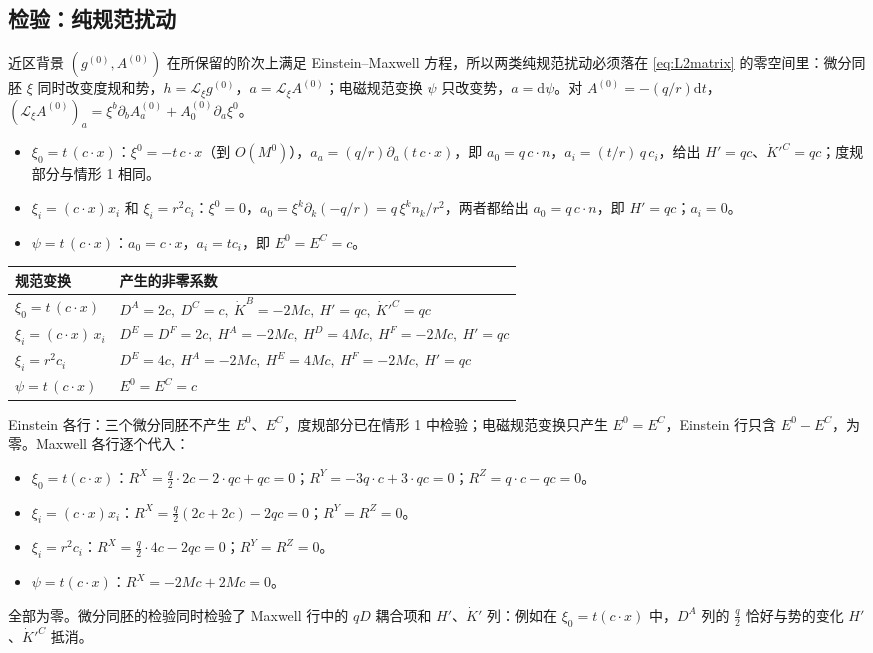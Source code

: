 \documentclass[11pt,a4paper]{ctexart}
\numberwithin{equation}{section}
\newcommand{\dd}{\mathrm d}
\begin{document}
\subsection{检验：纯规范扰动}

近区背景 $(g^{(0)},A^{(0)})$ 在所保留的阶次上满足 Einstein--Maxwell 方程，所以两类纯规范扰动必须落在 \eqref{eq:L2matrix} 的零空间里：微分同胚 $\xi$ 同时改变度规和势，$h=\mathcal L_\xi g^{(0)}$，$a=\mathcal L_\xi A^{(0)}$；电磁规范变换 $\psi$ 只改变势，$a=\dd\psi$。对 $A^{(0)}=-(q/r)\dd t$，$(\mathcal L_\xi A^{(0)})_a=\xi^b\partial_bA^{(0)}_a+A^{(0)}_0\partial_a\xi^0$。
\begin{itemize}
\item $\xi_0=t\,(c\cdot x)$：$\xi^0=-t\,c\cdot x$（到 $O(M^0)$），$a_a=(q/r)\partial_a(t\,c\cdot x)$，即 $a_0=q\,c\cdot n$，$a_i=(t/r)\,q\,c_i$，给出 $H'=qc$、$\dot K'^C=qc$；度规部分与情形 1 相同。
\item $\xi_i=(c\cdot x)x_i$ 和 $\xi_i=r^2c_i$：$\xi^0=0$，$a_0=\xi^k\partial_k(-q/r)=q\,\xi^kn_k/r^2$，两者都给出 $a_0=q\,c\cdot n$，即 $H'=qc$；$a_i=0$。
\item $\psi=t\,(c\cdot x)$：$a_0=c\cdot x$，$a_i=tc_i$，即 $E^0=E^C=c$。
\end{itemize}
\begin{center}\small
\begin{tabular}{p{}p{}}
\hline
规范变换 & 产生的非零系数\\
\hline
$\xi_0=t\,(c\cdot x)$ & $D^A=2c,\ D^C=c,\ \dot K^B=-2Mc,\ H'=qc,\ \dot K'^C=qc$\\
$\xi_i=(c\cdot x)\,x_i$ & $D^E=D^F=2c,\ H^A=-2Mc,\ H^D=4Mc,\ H^F=-2Mc,\ H'=qc$\\
$\xi_i=r^2c_i$ & $D^E=4c,\ H^A=-2Mc,\ H^E=4Mc,\ H^F=-2Mc,\ H'=qc$\\
$\psi=t\,(c\cdot x)$ & $E^0=E^C=c$\\
\hline
\end{tabular}
\end{center}
Einstein 各行：三个微分同胚不产生 $E^0$、$E^C$，度规部分已在情形 1 中检验；电磁规范变换只产生 $E^0=E^C$，Einstein 行只含 $E^0-E^C$，为零。Maxwell 各行逐个代入：
\begin{itemize}
\item $\xi_0=t(c\cdot x)$：$R^X=\tfrac q2\cdot2c-2\cdot qc+qc=0$；$R^Y=-3q\cdot c+3\cdot qc=0$；$R^Z=q\cdot c-qc=0$。
\item $\xi_i=(c\cdot x)x_i$：$R^X=\tfrac q2(2c+2c)-2qc=0$；$R^Y=R^Z=0$。
\item $\xi_i=r^2c_i$：$R^X=\tfrac q2\cdot4c-2qc=0$；$R^Y=R^Z=0$。
\item $\psi=t(c\cdot x)$：$R^X=-2Mc+2Mc=0$。
\end{itemize}
全部为零。微分同胚的检验同时检验了 Maxwell 行中的 $qD$ 耦合项和 $H'$、$\dot K'$ 列：例如在 $\xi_0=t(c\cdot x)$ 中，$D^A$ 列的 $\tfrac q2$ 恰好与势的变化 $H'$、$\dot K'^C$ 抵消。
\end{document}
